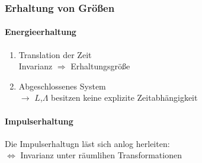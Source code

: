 \documentclass[a4paper]{article}
\begin{document}
\subsubsection{Erhaltung von Größen}
\paragraph{Energieerhaltung}
\begin{enumerate}
  \item Translation der Zeit \\ Invarianz $\Rightarrow$ Erhaltungsgröße
  \item Abgeschlossenes System \\ $\rightarrow$ $L$,$\Lambda$ besitzen keine
  explizite Zeitabhängigkeit
\end{enumerate}
\paragraph{Impulserhaltung} 
Die Impulserhaltugn läst sich anlog herleiten:\\
$\Leftrightarrow$ Invarianz unter räumlihen Transformationen
\end{document}
